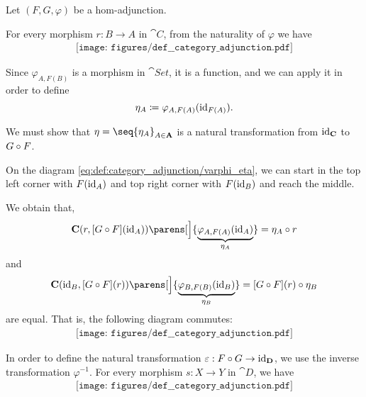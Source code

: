 \begin{defproof}
   Let \( (F, G, \varphi) \) be a hom-adjunction.

  For every morphism \( r: B \to A \) in \( \cat{C} \), from the naturality of \( \varphi \) we have
  \begin{equation}\label{eq:def:category_adjunction/varphi_eta}
    \begin{aligned}
      \texttt{[image: figures/def\_\_category\_adjunction.pdf]}
    \end{aligned}
  \end{equation}

  Since \( \varphi_{A,F(B)} \) is a morphism in \( \cat{Set} \), it is a function, and we can apply it in order to define
  \begin{equation*}
    \eta_A \coloneqq \varphi_{A,F(A)}(\operatorname{id}_{F(A)}).
  \end{equation*}

  We must show that \( \eta = \seq{ \eta_A }_{A \in \cat{A}} \) is a natural transformation from \( \operatorname{id}_{\operatorname{\mathbf{C}}} \) to \( G \bincirc F \).

  On the diagram \eqref{eq:def:category_adjunction/varphi_eta}, we can start in the top left corner with \( F(\operatorname{id}_A) \) and top right corner with \( F(\operatorname{id}_B) \) and reach the middle.

  We obtain that,
  \begin{equation*}
    \cat{C}(r, [G \bincirc F](\id_A))\parens[\Big]{ \underbrace{\varphi_{A, F(A)}(\id_A)}_{\eta_A} }
    =
    \eta_A \bincirc r
  \end{equation*}
  and
  \begin{equation*}
    \cat{C}(\id_B, [G \bincirc F](r))\parens[\Big]{ \underbrace{\varphi_{B, F(B)}(\id_B)}_{\eta_B} }
    =
    [G \bincirc F](r) \bincirc \eta_B
  \end{equation*}
  are equal. That is, the following diagram commutes:
  \begin{equation}\label{eq:def:category_adjunction/eta_nat}
    \begin{aligned}
      \texttt{[image: figures/def\_\_category\_adjunction.pdf]}
    \end{aligned}
  \end{equation}

  In order to define the natural transformation \( \varepsilon: F \bincirc G \to \id_{\cat{D}} \), we use the inverse transformation \( \varphi^{-1} \). For every morphism \( s: X \to Y \) in \( \cat{D} \), we have
  \begin{equation}\label{eq:def:category_adjunction/varphi_varepsilon}
    \begin{aligned}
      \texttt{[image: figures/def\_\_category\_adjunction.pdf]}
    \end{aligned}
  \end{equation}


\end{defproof}
